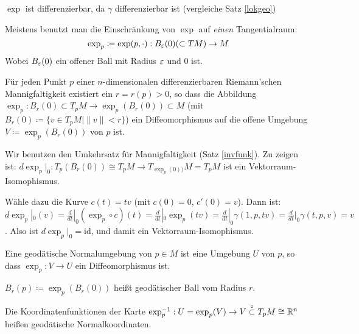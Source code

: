 \documentclass[a4paper,twoside,DIV15,BCOR12mm]{scrbook}
\newcommand{\otm}{\stackrel{\circ}{\subset}} %
\renewcommand{\da}{\coloneqq}
\begin{document}
\begin{bemerkungen}
\item $\exp$ ist differenzierbar, da $\gamma$ differenzierbar ist (vergleiche Satz \ref{lokgeo})
\item Meistens benutzt man die Einschränkung von $\exp$ auf \emph{einen} Tangentialraum:
\[
\exp_p \da \exp(p,\cdot): B_\ep(0) (\subset TM) \to M
\]
Wobei $B_\varepsilon(0)$ ein offener Ball mit Radius $\varepsilon$ und $0$ ist.
\end{bemerkungen}

\begin{satz}
Für jeden Punkt $p$ einer $n$-dimensionalen differenzierbaren Riemann’schen Mannigfaltigkeit existiert ein $r=r(p)>0$, so dass die Abbildung $\exp_p: B_r(0)\subset T_pM \to \exp_p(B_r(0)) \subset M$ (mit $B_r(0) \da \{v\in T_pM \mid \|v\|<r\}$) ein Diffeomorphismus auf die offene Umgebung $V\da \exp_p(B_r(0))$ von $p$ ist.
\end{satz}

\begin{beweis}
Wir benutzen den Umkehrsatz für Mannigfaltigkeit (Satz \ref{invfunk}). Zu zeigen ist: $d\exp_p|_0: T_p(B_r(0)) \cong T_pM \to T_{\exp_p(0))}M = T_pM$ ist ein Vektorraum-Isomophismus.

Wähle dazu die Kurve $c(t) = tv$ (mit $c(0)=0$, $c'(0)=v$). Dann ist: $d\exp_p|_0(v) = \frac d{dt}|_0 (\exp _p \circ c)(t) = \frac d{dt}|_0 \exp_p(tv) = \frac d{dt}|_0 \gamma(1,p,tv) = \frac d{dt}|_0 \gamma(t,p,v) = v$. Also ist $d\exp_p|_0 = \text{id}$, und damit ein Vektorraum-Isomophismus.
\end{beweis}

\begin{definition}
Eine geodätische Normalumgebung  von $p\in M$ ist eine Umgebung $U$ von $p$, so dass $\exp_p: V\to U$ ein Diffeomorphismus ist.

$B_r(p) \da \exp_p(B_r(0))$ heißt geodätischer Ball vom Radius $r$.

Die Koordinatenfunktionen der Karte $\exp_p^{-1} : U = \exp_p(V) \to V \otm T_pM \cong \MdR^n$ heißen geodätische Normalkoordinaten.
\end{definition}
\end{document}

